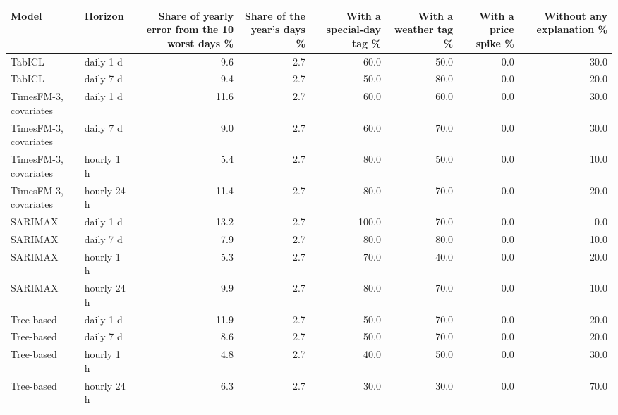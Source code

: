 \begin{tabular}{llrrrrrr}
\toprule
Model & Horizon & Share of yearly error from the 10 worst days \% & Share of the year's days \% & With a special-day tag \% & With a weather tag \% & With a price spike \% & Without any explanation \% \\
\midrule
TabICL & daily 1 d & 9.6 & 2.7 & 60.0 & 50.0 & 0.0 & 30.0 \\
TabICL & daily 7 d & 9.4 & 2.7 & 50.0 & 80.0 & 0.0 & 20.0 \\
TimesFM-3, covariates & daily 1 d & 11.6 & 2.7 & 60.0 & 60.0 & 0.0 & 30.0 \\
TimesFM-3, covariates & daily 7 d & 9.0 & 2.7 & 60.0 & 70.0 & 0.0 & 30.0 \\
TimesFM-3, covariates & hourly 1 h & 5.4 & 2.7 & 80.0 & 50.0 & 0.0 & 10.0 \\
TimesFM-3, covariates & hourly 24 h & 11.4 & 2.7 & 80.0 & 70.0 & 0.0 & 20.0 \\
SARIMAX & daily 1 d & 13.2 & 2.7 & 100.0 & 70.0 & 0.0 & 0.0 \\
SARIMAX & daily 7 d & 7.9 & 2.7 & 80.0 & 80.0 & 0.0 & 10.0 \\
SARIMAX & hourly 1 h & 5.3 & 2.7 & 70.0 & 40.0 & 0.0 & 20.0 \\
SARIMAX & hourly 24 h & 9.9 & 2.7 & 80.0 & 70.0 & 0.0 & 10.0 \\
Tree-based & daily 1 d & 11.9 & 2.7 & 50.0 & 70.0 & 0.0 & 20.0 \\
Tree-based & daily 7 d & 8.6 & 2.7 & 50.0 & 70.0 & 0.0 & 20.0 \\
Tree-based & hourly 1 h & 4.8 & 2.7 & 40.0 & 50.0 & 0.0 & 30.0 \\
Tree-based & hourly 24 h & 6.3 & 2.7 & 30.0 & 30.0 & 0.0 & 70.0 \\
\bottomrule
\end{tabular}
